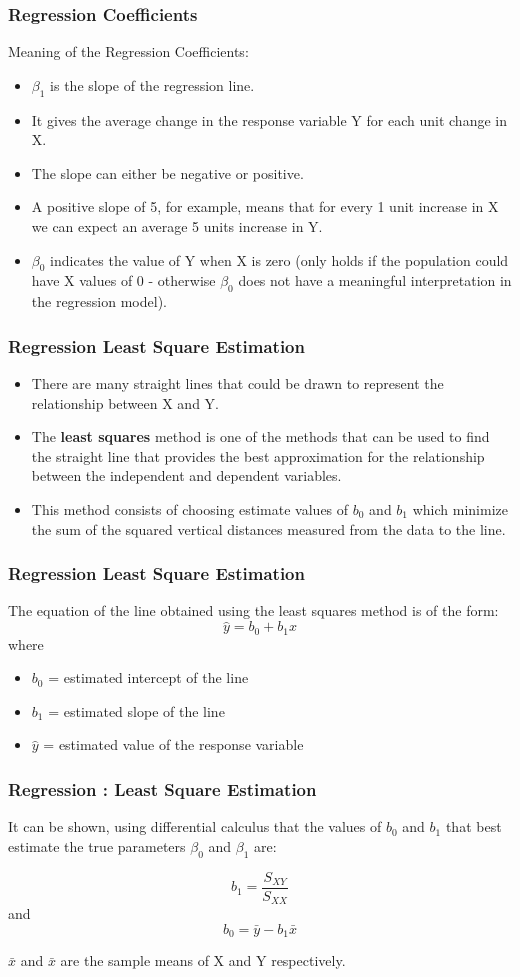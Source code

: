 \documentclass[a4]{beamer}
\begin{document}
\begin{frame}
\frametitle{Regression Coefficients} Meaning of the Regression Coefficients:
\begin{itemize} \item $\beta_1$ is the slope of the regression line.
\item It gives the average change in the response variable Y for each unit
change in X.
\item The slope can either be negative or positive.
\item A positive slope of 5, for example, means that for every 1 unit increase
in X we can expect an average 5 units increase in Y.
\item $\beta_0$ indicates the value of Y when X is zero (only holds if the population could
have X values of 0 - otherwise $\beta_0$ does not have a meaningful interpretation
in the regression model).
\end{itemize}
\end{frame}
\begin{frame}
\frametitle{Regression Least Square Estimation}
\begin{itemize}
\item There are many straight lines that could be drawn to represent the
relationship between X and Y.
\item The \textbf{least squares} method is one of the methods that can be used to find
the straight line that provides the best approximation for the relationship
between the independent and dependent variables.
\item This method consists of choosing estimate values of $b_0$ and $b_1$ which minimize the sum
of the squared vertical distances measured from the data to the line.
\end{itemize}
\end{frame}
\begin{frame}
\frametitle{Regression Least Square Estimation}
The
equation of the line obtained using the least squares method is of the form:
\[ \hat{y} = b_0 + b_1x \]
where
\begin{itemize}
\item $b_0$ = estimated intercept of the line
\item $b_1$ = estimated slope of the line
\item $\hat{y}$ = estimated value of the response variable
\end{itemize}
\end{frame}
\begin{frame}
\frametitle{Regression : Least Square Estimation}
It can be shown, using differential calculus that the values of $b_0$
and $b_1$ that best estimate the true parameters $\beta_0$ and $\beta_1$ are:

\[ b_1 = \frac{S_{XY}}{S_{XX}}\]
and
\[ b_0 = \bar{y} - b_1 \bar{x} \]

$\bar{x}$ and $\bar{x}$ are the sample means of X and Y respectively.
\end{frame}
\end{document}
